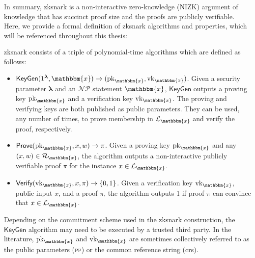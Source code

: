 In summary, \gls{zksnark} is a non-interactive zero-knowledge (NIZK) argument of knowledge that has succinct  proof size and the proofs are publicly verifiable. Here, we provide a formal definition of \gls{zksnark} algorithms and properties, which will be referenced throughout this thesis:

\begin{definition}
	\label{def:Algorithms in a zkSNARK scheme}

	\gls{zksnark} consists of a triple of polynomial-time algorithms which are defined as follows: 
	\begin{itemize}
		\item $\mathsf{KeyGen}(1^{\boldsymbol{\lambda}}, \mathbbm{x}) \rightarrow (\text{pk}_\mathbbm{x}, \text{vk}_\mathbbm{x})$. Given a security parameter $\boldsymbol{\lambda}$ and an $\mathcal{NP}$ statement $\mathbbm{x}$, $\mathsf{KeyGen}$ outputs a proving key $\text{pk}_\mathbbm{x}$ and a verification key $\text{vk}_\mathbbm{x}$. The proving and verifying keys are both published as public parameters. They can be used, any number of times, to prove membership in $\mathcal{L}_\mathbbm{x}$ and verify the proof, respectively.
		
		\item $\mathsf{Prove}(\text{pk}_\mathbbm{x}, x, w) \rightarrow \pi$. Given a proving key $\text{pk}_\mathbbm{x}$ and any $(x, w) \in \mathcal{R}_\mathbbm{x}$, the algorithm outputs a non-interactive publicly verifiable proof $\pi$ for the instance $x\in \mathcal{L}_\mathbbm{x}$.
		
		\item $\mathsf{Verify}(\text{vk}_\mathbbm{x}, x, \pi) \rightarrow \{0, 1\}$. Given a verification key $\text{vk}_\mathbbm{x}$, public input $x$, and a proof $\pi$, the algorithm outputs 1 if proof $\pi$ can convince that $x\in \mathcal{L}_\mathbbm{x}$.
	\end{itemize}
\end{definition}

Depending on the commitment scheme used in the \gls{zksnark} construction, the $\mathsf{KeyGen}$ algorithm may need to be executed by a trusted third party. In the literature, $\text{pk}_\mathbbm{x}$ and $\text{vk}_\mathbbm{x}$ are sometimes collectively referred to as the public parameters (\textsc{pp}) or the common reference string (\gls{crs}).

